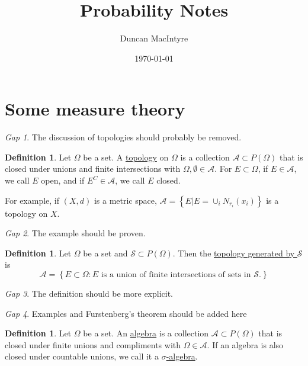 \documentclass[11pt]{article}
\newcommand{\col}[1]{\mathscr{#1}}
\newcommand{\pset}[1]{P\left(#1\right)}
\newcommand{\defname}[1]{\underline{#1}}
\theoremstyle{theorem}
\theoremstyle{definition}
\newtheorem{definition}[theorem]{Definition}
\theoremstyle{remark}
\theoremstyle{step}
\theoremstyle{gap}
\newtheorem*{gap}{Gap}
\begin{document}
\title{Probability Notes}
\author{Duncan MacIntyre}
\date{\today}
\maketitle
\tableofcontents
\bigskip
\newpage

\section{Some measure theory}

\begin{gap}
The discussion of topologies should probably be removed.
\end{gap}


\begin{definition}
Let \(\Omega\) be a set. A \defname{topology} on \(\Omega\) is a collection \(\col{A} \subset \pset{\Omega}\) that is closed under unions and finite intersections with \(\Omega, \emptyset \in \col{A}\). For \(E \subset \Omega\), if \(E \in \col{A}\), we call \(E\) open, and if \(E^C \in \col{A}\), we call \(E\) closed.
\end{definition}

For example, if \((X, d)\) is a metric space, \(\col{A} = \left\{E | E = \cup_i N_{r_i} \left(x_i\right)\right\}\) is a topology on \(X\).

\begin{gap} The example should be proven.\end{gap}

\begin{definition}
Let \(\Omega\) be a set and \(\col{S} \subset \pset{\Omega}\). Then the \defname{topology generated by \(\col{S}\)} is
\[\col{A} = \left\{E \subset \Omega : E \text{ is a union of finite intersections of sets in } \col{S}.\right\}\]
\end{definition}

\begin{gap} The definition should be more explicit.\end{gap}

\begin{gap} Examples and Furstenberg's theorem should be added here \end{gap}

\begin{definition}
Let \(\Omega\) be a set. An \defname{algebra} is a collection \(\col{A} \subset \pset{\Omega}\) that is closed under finite unions and compliments with \(\Omega \in \col{A}\). If an algebra is also closed under countable unions, we call it a \defname{\(\sigma\)-algebra}.
\end{definition}
\end{document}
